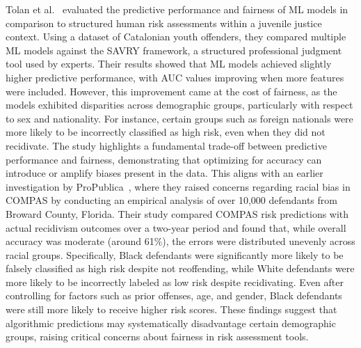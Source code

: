 \documentclass[12pt]{article}
\begin{document}
Tolan et al.~\cite{tolan2019machine} evaluated the predictive performance and fairness of ML models in comparison to structured human risk assessments within a juvenile justice context. Using a dataset of Catalonian youth offenders, they compared multiple ML models against the SAVRY framework, a structured professional judgment tool used by experts. Their results showed that ML models achieved slightly higher predictive performance, with AUC values improving when more features were included. However, this improvement came at the cost of fairness, as the models exhibited disparities across demographic groups, particularly with respect to sex and nationality. For instance, certain groups such as foreign nationals were more likely to be incorrectly classified as high risk, even when they did not recidivate. The study highlights a fundamental trade-off between predictive performance and fairness, demonstrating that optimizing for accuracy can introduce or amplify biases present in the data. This aligns with an earlier investigation by ProPublica~\cite{propublica2016analysis}, where they raised concerns regarding racial bias in COMPAS by conducting an empirical analysis of over 10,000 defendants from Broward County, Florida. Their study compared COMPAS risk predictions with actual recidivism outcomes over a two-year period and found that, while overall accuracy was moderate (around 61\%), the errors were distributed unevenly across racial groups. Specifically, Black defendants were significantly more likely to be falsely classified as high risk despite not reoffending, while White defendants were more likely to be incorrectly labeled as low risk despite recidivating. Even after controlling for factors such as prior offenses, age, and gender, Black defendants were still more likely to receive higher risk scores. These findings suggest that algorithmic predictions may systematically disadvantage certain demographic groups, raising critical concerns about fairness in risk assessment tools.\\ 
\end{document}

